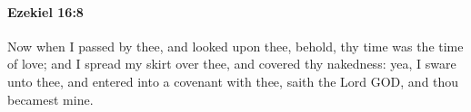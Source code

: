 
		\paragraph{Ezekiel 16:8} %
			\label{EZEKIEL-16-8}

			Now when I passed by thee, and looked upon thee, behold, thy time was the time of love; and I spread my skirt over thee, and covered thy nakedness: yea, I sware unto thee, and entered into a covenant with thee, saith the Lord GOD, and thou becamest mine.


